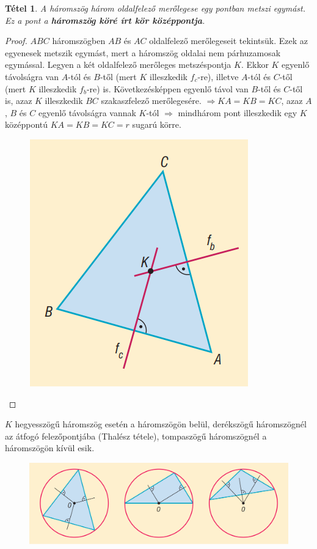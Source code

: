 \documentclass[12pt,a4paper]{article}
\newtheorem{theorem}{Tétel} [section]
\begin{document}
\begin{theorem}
A háromszög három oldalfelező merőlegese egy pontban metszi egymást. Ez a pont a \textbf{háromszög köré írt kör középpontja}.
\end{theorem}
\begin{proof}
$ABC$ háromszögben $AB$ és $AC$ oldalfelező merőlegeseit tekintsük. Ezek az egyenesek metszik egymást, mert a háromszög oldalai nem párhuzamosak egymással. Legyen a két oldalfelező merőleges metszéspontja $K$. Ekkor $K$ egyenlő távolságra van $A$-tól és $B$-től (mert $K$ illeszkedik $f_c$-re), illetve $A$-tól és $C$-től (mert $K$ illeszkedik $f_b$-re) is. Következésképpen egyenlő távol van $B$-től és $C$-től is, azaz $K$ illeszkedik $BC$ szakaszfelező merőlegesére. $\Rightarrow KA = KB = KC$, azaz $A$, $B$ és $C$ egyenlő távolságra vannak $K$-tól $\Rightarrow$ mindhárom pont illeszkedik egy $K$ középpontú $KA = KB = KC = r$ sugarú körre.
\begin{figure}[h]
\centering
\includegraphics[scale=0.4]{geometry/korul_irt_kor}
\end{figure}

\end{proof}

$K$ hegyesszögű háromszög esetén a háromszögön belül, derékszögű háromszögnél az átfogó felezőpontjába (Thalész tétele), tompaszögű háromszögnél a háromszögön kívül esik.
\begin{figure}[h]
\centering
\includegraphics[scale=0.2]{geometry/korul_irt_kor_esetek}
\end{figure}
\newpage
\end{document}
